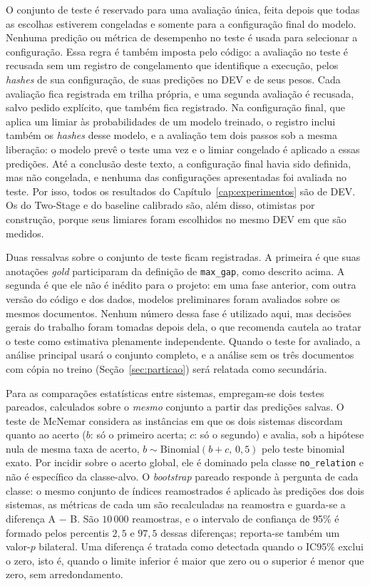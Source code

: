 O conjunto de teste é reservado para uma avaliação única, feita depois que todas
as escolhas estiverem congeladas e somente para a configuração final do modelo.
Nenhuma predição ou métrica de desempenho no teste é usada para selecionar a
configuração. Essa regra é também imposta pelo código: a avaliação no teste é
recusada sem um registro de congelamento que identifique a execução, pelos
\emph{hashes} de sua configuração, de suas predições no DEV e de seus pesos. Cada
avaliação fica registrada em trilha própria, e uma segunda avaliação é recusada,
salvo pedido explícito, que também fica registrado. Na configuração final, que aplica
um limiar às probabilidades de um modelo treinado, o registro inclui também os
\emph{hashes} desse modelo, e a avaliação tem dois passos sob a mesma liberação: o
modelo prevê o teste uma vez e o limiar congelado é aplicado a essas predições. Até
a conclusão deste texto, a configuração final havia sido definida, mas não
congelada, e nenhuma das configurações apresentadas foi avaliada no teste. Por
isso, todos os resultados do Capítulo~\ref{cap:experimentos} são de DEV. Os do
Two-Stage e do baseline calibrado são, além disso, otimistas por construção, porque
seus limiares foram escolhidos no mesmo DEV em que são medidos.

Duas ressalvas sobre o conjunto de teste ficam registradas. A primeira é que suas
anotações \emph{gold} participaram da definição de \texttt{max\_gap}, como descrito
acima. A segunda é que ele não é inédito para o projeto: em uma fase anterior, com
outra versão do código e dos dados, modelos preliminares foram avaliados sobre os
mesmos documentos. Nenhum número dessa fase é utilizado aqui, mas decisões gerais
do trabalho foram tomadas depois dela, o que recomenda cautela ao tratar o teste
como estimativa plenamente independente. Quando o teste for avaliado, a análise
principal usará o conjunto completo, e a análise sem os três documentos com cópia
no treino (Seção~\ref{sec:particao}) será relatada como secundária.

\label{sec:avaliacao}
Para as comparações estatísticas entre sistemas, empregam-se dois testes pareados, calculados sobre o
\emph{mesmo} conjunto a partir das predições salvas. O teste de McNemar
\cite{dietterich_1998_mcnemar} considera as instâncias em que os dois sistemas
discordam quanto ao acerto ($b$: só o primeiro acerta; $c$: só o segundo) e avalia,
sob a hipótese nula de mesma taxa de acerto, $b \sim \mathrm{Binomial}(b+c,\,0{,}5)$
pelo teste binomial exato. Por incidir sobre o acerto global, ele é dominado pela
classe \texttt{no\_relation} e não é específico da classe-alvo. O
\emph{bootstrap} pareado responde à pergunta de cada classe: o mesmo conjunto de
índices reamostrados é aplicado às predições dos dois sistemas, as métricas de cada
um são recalculadas na reamostra e guarda-se a diferença A $-$ B. São $10\,000$
reamostras, e o intervalo de confiança de 95\% é formado pelos percentis $2{,}5$ e
$97{,}5$ dessas diferenças; reporta-se também um valor-$p$ bilateral. Uma diferença é
tratada como detectada quando o IC95\% exclui o zero, isto é, quando o limite
inferior é maior que zero ou o superior é menor que zero, sem arredondamento.

